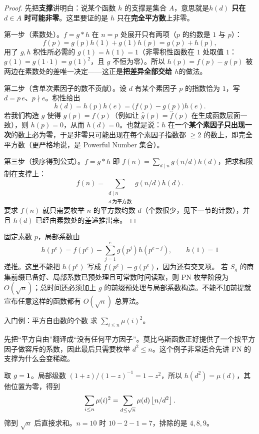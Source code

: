 \begin{proof}
先把\textbf{支撑}讲明白：说某个函数 $h$ 的支撑是集合 $A$，意思就是\textbf{$h(d)$ 只在 $d\in A$ 时可能非零}。这里要证的是 $h$ 只在\textbf{完全平方数}上非零。

第一步（素数处）。$f=g*h$ 在 $n=p$ 处展开只有两项（$p$ 的约数是 $1$ 与 $p$）：
\[
 f(p)=g(p)h(1)+g(1)h(p)=g(p)+h(p),
\]
用了 $g,h$ 积性所必需的 $g(1)=h(1)=1$（非零积性函数在 $1$ 处取值 $1$：$g(1)=g(1\cdot1)=g(1)^2$，且 $g$ 不恒为零）。所以 $h(p)=f(p)-g(p)$ 被两边在素数处的差唯一决定——这正是\textbf{把差异全部交给 $h$}的做法。

第二步（含单次素因子的数不贡献）。设 $d$ 有某个素因子 $p$ 的指数恰为 $1$，写 $d=p\,e$、$p\nmid e$。积性给出
\[
 h(d)=h(p)h(e)=\big(f(p)-g(p)\big)h(e).
\]
若我们构造 $g$ 使得 $g(p)=f(p)$（例如让 $\hat g(p)=\hat f(p)$ 在生成函数层面一致），则 $h(p)=0$，从而 $h(d)=0$。也就是说：$h$ 在一个\textbf{某个素因子只出现一次}的数上必为零，于是非零只可能出现在每个素因子指数都 $\ge2$ 的数上，即完全平方数（更严格地说，是 Powerful Number 集合）。

第三步（换序得到公式）。$f=g*h$ 即 $f(n)=\sum_{d\mid n}g(n/d)h(d)$，把求和限制在支撑上：
\[
 f(n)=\sum_{\substack{d\mid n\\ d\ \text{为平方数}}} g(n/d)h(d).
\]
要求 $f(n)$ 就只需要枚举 $n$ 的平方数约数 $d$（个数很少，见下一节的计数），并且 $h(d)$ 已经由素数处的差递推出来。
\end{proof}
固定素数 $p$，局部系数由
\[
 h(p^e)=f(p^e)-\sum_{j=1}^e g(p^j)h(p^{e-j}),\qquad h(1)=1
\]
递推。这里不能把 $h(p^e)$ 写成 $f(p^e)-g(p^e)$，因为还有交叉项。
\cost 若 $S_g$ 的商集前缀已备好、局部系数已预处理且可常数时间读取，则 PN 枚举阶段为 $O(\sqrt n)$；总时间还必须加上 $g$ 的前缀预处理与局部系数构造。不能不加前提就宣布任意这样的函数都有 $O(\sqrt n)$ 总算法。

\begin{problem}{入门例：平方自由数的个数}
求 $\sum_{i\le n}\mu(i)^2$。
\end{problem}
\begin{pitfall}[讲解：先看这题到底在做什么]
先把“平方自由”翻译成“没有任何平方因子”。莫比乌斯函数正好提供了一个按平方因子做容斥的系数，因此最后只需要枚举 $d^2\le n$。这个例子非常适合先讲 PN 的支撑为什么会变稀疏。
\end{pitfall}

\sol 取 $g=\mathbf 1$。局部级数 $(1+z)/(1-z)^{-1}=1-z^2$，所以 $h(d^2)=\mu(d)$，其他位置为零，得到
\[
 \sum_{i\le n}\mu(i)^2=\sum_{d\le\sqrt n}\mu(d)\left\lfloor n/d^2\right\rfloor.
\]
筛到 $\sqrt n$ 后直接求和。$n=10$ 时 $10-2-1=7$，排除的是 $4,8,9$。


